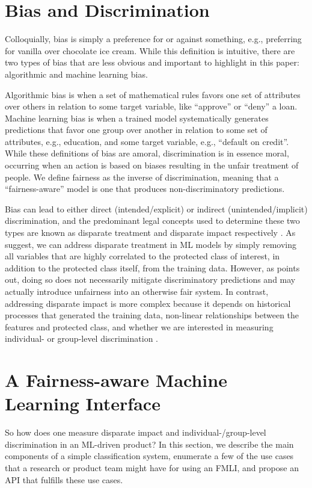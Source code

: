 \documentclass{acm_proc_article-sp}
\begin{document}
\section{Bias and Discrimination}
Colloquially, bias is simply a preference for or against something, e.g.,
preferring for vanilla over chocolate ice cream. While this definition is
intuitive, there are two types of bias that are less obvious and important to
highlight in this paper: algorithmic and machine learning bias.

Algorithmic bias is when a set of mathematical rules favors one set of
attributes over others in relation to some target variable, like ``approve'' or
``deny'' a loan. Machine learning bias is when a trained model systematically
generates predictions that favor one group over another in relation to some
set of attributes, e.g., education, and some target variable, e.g., ``default
on credit''. While these definitions of bias are amoral, discrimination is in
essence moral, occurring when an action is based on biases resulting in the
unfair treatment of people. We define fairness as the inverse of
discrimination, meaning that a ``fairness-aware'' model is one that produces
non-discriminatory predictions.

Bias can lead to either direct (intended/explicit) or indirect
(unintended/implicit) discrimination, and the predominant legal concepts used to
determine these two types are known as disparate treatment and disparate impact
respectively \cite{barocas2016big}. As \cite{kusner2017counterfactual,
kamiran2012data} suggest, we can address disparate treatment in ML models by
simply removing all variables that are highly correlated to the protected class
of interest, in addition to the protected class itself, from the training data.
However, as \cite{kusner2017counterfactual} points out, doing so does not
necessarily mitigate discriminatory predictions and may actually introduce
unfairness into an otherwise fair system. In contrast, addressing disparate
impact is more complex because it depends on historical processes that generated
the training data, non-linear relationships between the features and protected
class, and whether we are interested in measuring individual- or group-level
discrimination \cite{dwork2012fairness}.

\section{A Fairness-aware Machine Learning Interface} So how does one measure
disparate impact and individual-/group-level discrimination in an ML-driven
product? In this section, we describe the main components of a simple
classification system, enumerate a few of the use cases that a research or
product team might have for using an FMLI, and propose an API that fulfills
these use cases.
\end{document}
